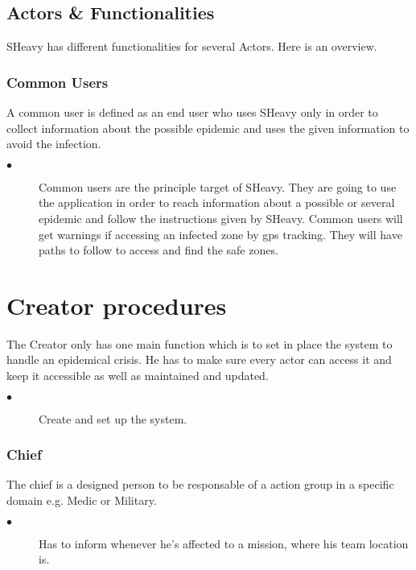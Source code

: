 \subsection{Actors \& Functionalities}
SHeavy has different functionalities for several Actors. Here is an overview.\\

\subsubsection{Common Users}
A common user is defined as an end user who uses SHeavy only in order to
collect information about the possible epidemic and uses the given information
to avoid the infection.\\
\begin{description}
 \item[$\bullet$] Common users are the principle target of SHeavy. They are
 going to use the application in order to reach information about a possible
 or several epidemic and follow the instructions given by SHeavy. Common users will get warnings if accessing an infected
zone by gps tracking. They will have paths to follow to access and find the
safe zones.
\end{description}

\section{Creator procedures}

The Creator only has one main function which is to set in place the system to
handle an epidemical crisis. He has to make sure every actor can access it and
keep it accessible as well as maintained and updated.\\
\begin{description}
 \item[$\bullet$] Create and set up the system.
\end{description} 

\subsubsection{Chief}
The chief is a designed person to be responsable of a action group in a specific
domain e.g. Medic or Military.\\
\begin{description}
 \item[$\bullet$] Has to inform whenever he's affected to a mission, where his
 team location is.
\end{description} 

